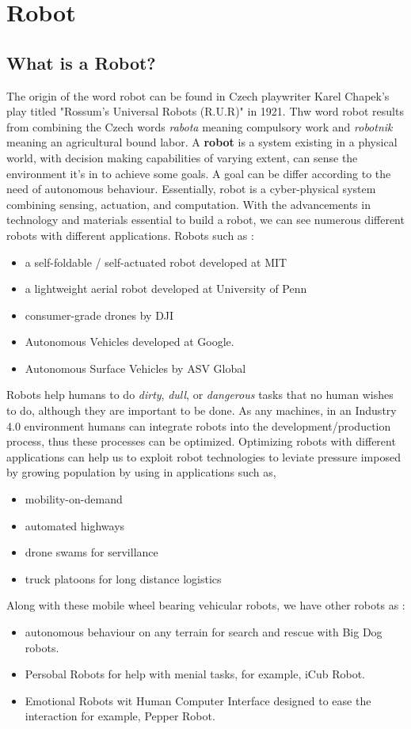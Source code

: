 \section{Robot}
\subsection{What is a Robot?}
The origin of the word robot can be found in Czech playwriter Karel Chapek's play titled "Rossum's
Universal Robots (R.U.R)" in 1921. Thw word robot results from combining the Czech words \textit{rabota} meaning 
compulsory work and \textit{robotnik} meaning an agricultural bound labor. A \textbf{robot} is a system existing 
in a physical world, with decision making capabilities of varying extent, can sense the environment it's in to achieve
some goals. A goal can be differ according to the need of autonomous behaviour. Essentially, robot is a cyber-physical system 
combining sensing, actuation, and computation. With the advancements in technology and materials essential to build a robot, we can
see numerous different robots with different applications. Robots such as : 
\begin{itemize}
    \item a self-foldable / self-actuated robot developed at MIT \cite{Sung2016ComputationalDO}
    \item a lightweight aerial robot developed at University of Penn
    \item consumer-grade drones by DJI 
    \item Autonomous Vehicles developed at Google.
    \item Autonomous Surface Vehicles by ASV Global
\end{itemize}
Robots help humans to do \textit{dirty}, \textit{dull}, or \textit{dangerous} tasks that no human wishes to do, although they are
important to be done. As any machines, in an Industry 4.0 environment humans can integrate robots into the development/production process,
thus these processes can be optimized. Optimizing robots with different applications can help us to exploit robot technologies to leviate pressure
imposed by growing population by using in applications such as, \begin{itemize}
    \item  mobility-on-demand
    \item  automated highways
    \item  drone swams for servillance
    \item  truck platoons for long distance logistics
\end{itemize} Along with these mobile wheel bearing vehicular robots, we have other robots as : 
\begin{itemize}
    \item autonomous behaviour on any terrain for search and rescue with Big Dog robots.
    \item Persobal Robots for help with menial tasks, for example, iCub Robot.
    \item Emotional Robots wit Human Computer Interface designed to ease the interaction for example, Pepper Robot.
\end{itemize}

